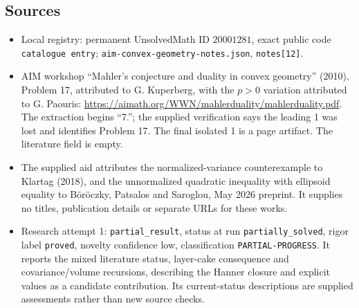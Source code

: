 \documentclass[11pt]{article}
\begin{document}
\subsection{Sources}
\begin{itemize}
\item Local registry: permanent UnsolvedMath ID \(20001281\), exact public code \texttt{catalogue entry}; \texttt{aim-convex-geometry-notes.json}, \texttt{notes[12]}.
\item AIM workshop ``Mahler's conjecture and duality in convex geometry'' (2010), Problem 17, attributed to G. Kuperberg, with the \(p>0\) variation attributed to G. Paouris: \url{https://aimath.org/WWN/mahlerduality/mahlerduality.pdf}. The extraction begins ``7.''; the supplied verification says the leading 1 was lost and identifies Problem 17. The final isolated 1 is a page artifact. The literature field is empty.
\item The supplied aid attributes the normalized-variance counterexample to Klartag (2018), and the unnormalized quadratic inequality with ellipsoid equality to Böröczky, Patsalos and Saroglou, May 2026 preprint. It supplies no titles, publication details or separate URLs for these works.
\item Research attempt 1: \texttt{partial\_result}, status at run \texttt{partially\_solved}, rigor label \texttt{proved}, novelty confidence low, classification \texttt{PARTIAL-PROGRESS}. It reports the mixed literature status, layer-cake consequence and covariance/volume recursions, describing the Hanner closure and explicit values as a candidate contribution. Its current-status descriptions are supplied assessments rather than new source checks.
\end{itemize}
\end{document}

